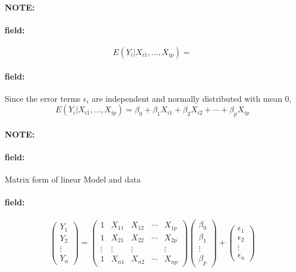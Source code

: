 \documentclass[12pt]{article}
\newenvironment{note}{\paragraph{NOTE:}}{}
\newenvironment{field}{\paragraph{field:}}{}
\begin{document}
\begin{note}
  \begin{field}
    $$ E(Y_i | X_{i1}, \ldots , X_{ip}) = $$
  \end{field}
  \begin{field}
    Since the error terms $\epsilon_i$ are independent and normally distributed with mean 0,
    $$ E(Y_i | X_{i1}, \ldots , X_{ip}) = \beta_0 + \beta_1 X_{i1} + \beta_2 X_{i2} + \cdots + \beta_pX_{ip}$$
  \end{field}
\end{note}

\begin{note}
  \begin{field}
    Matrix form of linear Model and data
  \end{field}
  \begin{field}
    $$ \begin{pmatrix}
      Y_1 \\ Y_2 \\ \vdots \\ Y_n
    \end{pmatrix}  = \begin{pmatrix}
      1 & X_{11} & X_{12} & \cdots & X_{1p}\\
      1 & X_{21} & X_{22} & \cdots & X_{2p}\\
      \vdots & \vdots & \vdots & & \vdots \\
      1 & X_{n1} & X_{n2} & \cdots & X_{np}
    \end{pmatrix} \begin{pmatrix}
      \beta_0 \\ \beta_1 \\ \vdots \\ \beta_p
    \end{pmatrix} + \begin{pmatrix}
      \epsilon_1 \\ \epsilon_2 \\ \vdots \\ \epsilon_n
    \end{pmatrix}$$
  \end{field}
\end{note}
\end{document}
